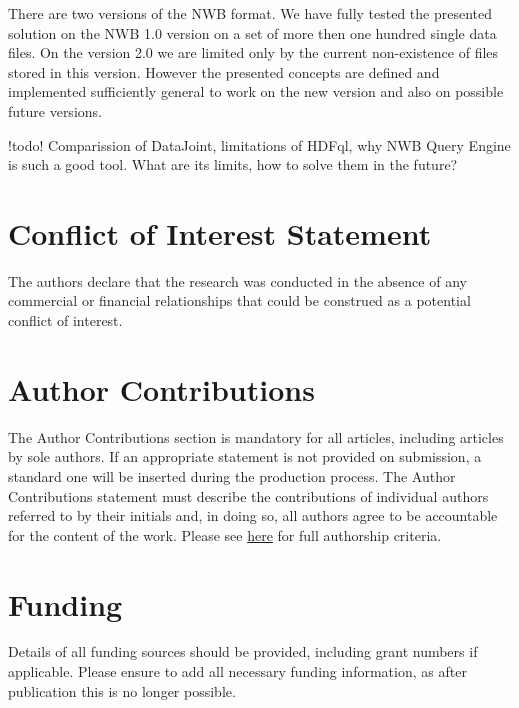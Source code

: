 \documentclass[utf8]{frontiersSCNS} %
\begin{document}
There are two versions of the NWB format. We have fully tested the presented solution on the NWB 1.0 version on a set of more then one hundred single data files. On the version 2.0 we are limited only by the current non-existence of files stored in this version. However the presented concepts are defined and implemented sufficiently general to work on the new version and also on possible future versions.

!todo! Comparission of DataJoint, limitations of HDFql, why NWB Query Engine is such a good tool. What are its limits, how to solve them in the future?


\section*{Conflict of Interest Statement}

The authors declare that the research was conducted in the absence of any commercial or financial relationships that could be construed as a potential conflict of interest.

\section*{Author Contributions}

The Author Contributions section is mandatory for all articles, including articles by sole authors. If an appropriate statement is not provided on submission, a standard one will be inserted during the production process. The Author Contributions statement must describe the contributions of individual authors referred to by their initials and, in doing so, all authors agree to be accountable for the content of the work. Please see  \href{http://home.frontiersin.org/about/author-guidelines#AuthorandContributors}{here} for full authorship criteria.

\section*{Funding}
Details of all funding sources should be provided, including grant numbers if applicable. Please ensure to add all necessary funding information, as after publication this is no longer possible.
\end{document}
